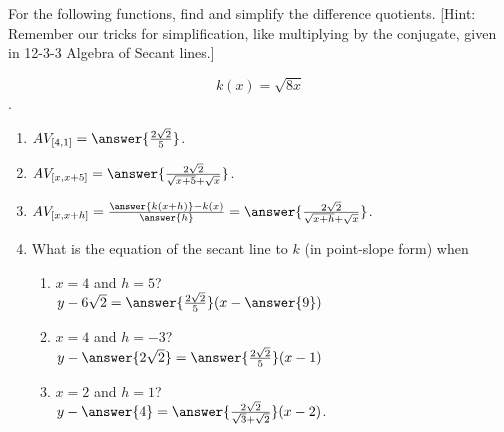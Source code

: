 \documentclass{ximera}
\author{Elizabeth Campolongo}
\begin{document}
\begin{exercise}

For the following functions, 
find and simplify the difference quotients. [Hint: Remember our tricks for simplification, like multiplying by the conjugate, given in 12-3-3 Algebra of Secant lines.]

 $$k(x)= \sqrt{8x}$$.

\begin{enumerate}

\item $AV_{[4,1]} = \answer{\frac{2\sqrt{2}}{5}}$.

\item $AV_{[x,x+5]} =  \answer{\frac{2\sqrt{2}}{\sqrt{x+5} + \sqrt{x}}}$.

\item $AV_{[x,x+h]} = \frac{\answer{k(x+h)}-k(x)}{\answer{h}}   = \answer{\frac{2\sqrt{2}}{\sqrt{x+h} + \sqrt{x}}}$.  

\item What is the equation of the secant line to $k$ (in point-slope form) when
\begin{enumerate}
\item $x = 4$ and $h=5$? \\
$y-6\sqrt{2} = \answer{\frac{2\sqrt{2}}{5}}(x-\answer{9})$

\item $x = 4$ and $h = -3$? \\
$y - \answer{2\sqrt{2}} = \answer{\frac{2\sqrt{2}}{5}}(x-1)$

\item $x = 2$ and $h= 1$? \\
$y - \answer{4} = \answer{\frac{2\sqrt{2}}{\sqrt{3} + \sqrt{2}}}(x-2)$.
\end{enumerate}

	
\end{enumerate}
\end{exercise}
\end{document}
